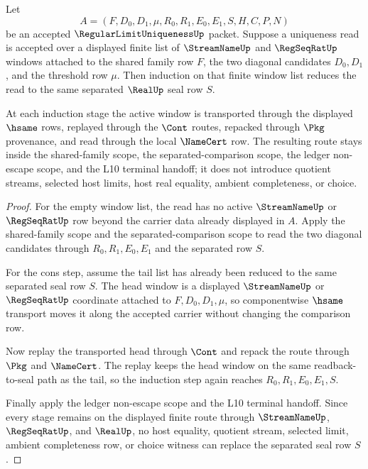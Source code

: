\begin{theorem}
\label{thm:regular-limit-uniqueness-finite-window-induction}
Let
$$
A=(F,D_0,D_1,\mu,R_0,R_1,E_0,E_1,S,H,C,P,N)
$$
be an accepted $\RegularLimitUniquenessUp$ packet. Suppose a uniqueness read is accepted over a displayed finite list of $\StreamNameUp$ and $\RegSeqRatUp$ windows attached to the shared family row $F$, the two diagonal candidates $D_0,D_1$, and the threshold row $\mu$. Then induction on that finite window list reduces the read to the same separated $\RealUp$ seal row $S$.

At each induction stage the active window is transported through the displayed $\hsame$ rows, replayed through the $\Cont$ routes, repacked through $\Pkg$ provenance, and read through the local $\NameCert$ row. The resulting route stays inside the shared-family scope, the separated-comparison scope, the ledger non-escape scope, and the L10 terminal handoff; it does not introduce quotient streams, selected host limits, host real equality, ambient completeness, or choice.
\end{theorem}
\begin{proof}
For the empty window list, the read has no active $\StreamNameUp$ or $\RegSeqRatUp$ row beyond the carrier data already displayed in $A$. Apply the shared-family scope and the separated-comparison scope to read the two diagonal candidates through $R_0,R_1,E_0,E_1$ and the separated row $S$.

For the cons step, assume the tail list has already been reduced to the same separated seal row $S$. The head window is a displayed $\StreamNameUp$ or $\RegSeqRatUp$ coordinate attached to $F,D_0,D_1,\mu$, so componentwise $\hsame$ transport moves it along the accepted carrier without changing the comparison row.

Now replay the transported head through $\Cont$ and repack the route through $\Pkg$ and $\NameCert$. The replay keeps the head window on the same readback-to-seal path as the tail, so the induction step again reaches $R_0,R_1,E_0,E_1,S$.

Finally apply the ledger non-escape scope and the L10 terminal handoff. Since every stage remains on the displayed finite route through $\StreamNameUp$, $\RegSeqRatUp$, and $\RealUp$, no host equality, quotient stream, selected limit, ambient completeness row, or choice witness can replace the separated seal row $S$.
\end{proof}

